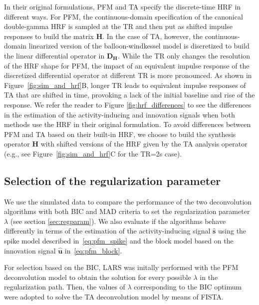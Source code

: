 In their original formulations, PFM and TA specify the discrete-time HRF in
different ways. For PFM, the continuous-domain specification of the canonical
double-gamma HRF \citep{HENSON2007178} is sampled at the TR and then put as
shifted impulse responses to build the matrix $\mathbf{H}$.  In the case of TA,
however, the continuous-domain linearized version of the balloon-windkessel
model is discretized to build the linear differential operator in
$\mathbf{D_H}$. While the TR only changes the resolution of the HRF shape for
PFM, the impact of an equivalent impulse response of the discretized
differential operator at different TR is more pronounced. As shown in
Figure~\ref{fig:sim_and_hrf}B, longer TR leads to equivalent impulse responses
of TA that are shifted in time, provoking a lack of the initial baseline and
rise of the response. We refer the reader to Figure {\ref{fig:hrf_differences}}
to see the differences in the estimation of the activity-inducing and innovation
signals when both methods use the HRF in their original formulation. To avoid
differences between PFM and TA based on their built-in HRF, we choose to build
the synthesis operator $\mathbf{H}$ with shifted versions of the HRF given by
the TA analysis operator (e.g., see Figure~\ref{fig:sim_and_hrf}C for the TR=2s
case).

\subsection{Selection of the regularization parameter}

We use the simulated data to compare the performance of the two deconvolution
algorithms with both BIC and MAD criteria to set the regularization parameter
$\lambda$ (see section \ref{sec:regparam}). We also evaluate if the algorithms
behave differently in terms of the estimation of the activity-inducing signal
$\mathbf{\hat{s}}$ using the spike model described in~\eqref{eq:pfm_spike} and
the block model based on the innovation signal $\mathbf{\hat{u}}$
in~\eqref{eq:pfm_block}.

For selection based on the BIC, LARS was initally performed with the PFM
deconvolution model to obtain the solution for every possible $\lambda$ in the
regularization path. Then, the values of $\lambda$ corresponding to the BIC
optimum were adopted to solve the TA deconvolution model by means of FISTA. 

